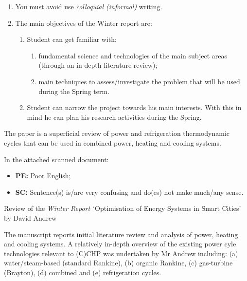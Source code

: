 \documentclass[14pt,twoside]{report}
\begin{document}
\begin{enumerate}
\item You \underline{must} avoid use {\it colloquial (informal)} writing.  
%
\item The main objectives of the Winter report are:
\begin{enumerate} 
\item Student can get familiar with:    
\begin{enumerate}
\item fundamental science and technologies of the main subject areas (through an in-depth literature review);
\item main techniques to assess/investigate the problem that will be used during the Spring term.
\end{enumerate}
\item Student can narrow the project towards his main interests. With this in mind he can plan his research activities during the Spring.
\end{enumerate}
% 
\end{enumerate}

The paper is a superficial review of power and refrigeration thermodynamic cycles that can be used in combined power, heating and cooling systems. 

In the attached scanned document:
\begin{itemize}
\item {\bf PE:} Poor English;
\item {\bf SC:} Sentence(s) is/are very confusing and do(es) not make much/any sense.   
\end{itemize}
\medskip



\clearpage


\bigskip

\begin{center}
  {\Large Review of the {\it Winter Report} $\lq$Optimisation of Energy Systems in Smart Cities' by David Andrew}
\end{center}

The manuscript reports initial literature review and analysis of power, heating and cooling systems. A relatively in-depth overview of the existing power cyle technologies relevant to (C)CHP was undertaken by Mr Andrew including: (a) water/steam-based (standard Rankine), (b) organic Rankine, (c) gas-turbine (Brayton), (d) combined and (e) refrigeration cycles.
\end{document}
